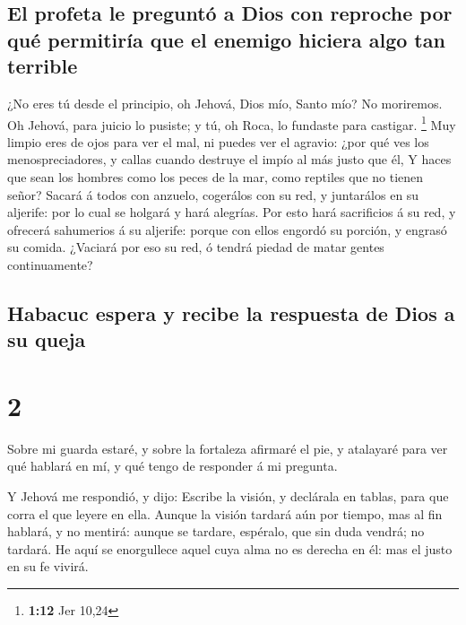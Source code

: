 \hypertarget{el-profeta-le-preguntuxf3-a-dios-con-reproche-por-quuxe9-permitiruxeda-que-el-enemigo-hiciera-algo-tan-terrible}{%
\subsection{El profeta le preguntó a Dios con reproche por qué
permitiría que el enemigo hiciera algo tan
terrible}\label{el-profeta-le-preguntuxf3-a-dios-con-reproche-por-quuxe9-permitiruxeda-que-el-enemigo-hiciera-algo-tan-terrible}}

 ¿No eres tú desde el principio, oh Jehová, Dios mío, Santo
mío? No moriremos. Oh Jehová, para juicio lo pusiste; y tú, oh Roca, lo
fundaste para castigar. \footnote{\textbf{1:12} Jer 10,24} 
Muy limpio eres de ojos para ver el mal, ni puedes ver el agravio: ¿por
qué ves los menospreciadores, y callas cuando destruye el impío al más
justo que él,  Y haces que sean los hombres como los peces
de la mar, como reptiles que no tienen señor?  Sacará á
todos con anzuelo, cogerálos con su red, y juntarálos en su aljerife:
por lo cual se holgará y hará alegrías.  Por esto hará
sacrificios á su red, y ofrecerá sahumerios á su aljerife: porque con
ellos engordó su porción, y engrasó su comida.  ¿Vaciará
por eso su red, ó tendrá piedad de matar gentes continuamente?

\hypertarget{habacuc-espera-y-recibe-la-respuesta-de-dios-a-su-queja}{%
\subsection{Habacuc espera y recibe la respuesta de Dios a su
queja}\label{habacuc-espera-y-recibe-la-respuesta-de-dios-a-su-queja}}

\hypertarget{section-1}{%
\section{2}\label{section-1}}

 Sobre mi guarda estaré, y sobre la fortaleza afirmaré el
pie, y atalayaré para ver qué hablará en mí, y qué tengo de responder á
mi pregunta.

 Y Jehová me respondió, y dijo: Escribe la visión, y
declárala en tablas, para que corra el que leyere en ella. 
Aunque la visión tardará aún por tiempo, mas al fin hablará, y no
mentirá: aunque se tardare, espéralo, que sin duda vendrá; no tardará.
 He aquí se enorgullece aquel cuya alma no es derecha en él:
mas el justo en su fe vivirá.

